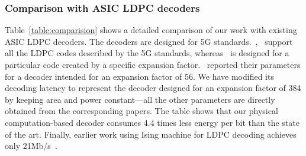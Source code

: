 \subsubsection {Comparison with ASIC LDPC decoders}
Table~\ref{table:comparision} shows a detailed comparison of our work with existing ASIC LDPC decoders. 
The decoders are designed for 5G standards.~\cite{lin202133},~\cite{lee2022multi} support all the LDPC codes described by the 5G standards, whereas~\cite{thi2021low} is designed for a particular code created by a specific expansion factor.~\cite{thi2021low} reported their parameters for a decoder intended for an expansion factor of 56. We have modified its decoding latency to represent the decoder designed for an expansion factor of 384 by keeping area and power constant—all the other parameters are directly obtained from the corresponding papers. The table shows that our physical computation-based decoder consumes 4.4 times less energy per bit than the state of the art. Finally, earlier work using Ising machine for LDPC decoding achieves only 21Mb/s~\cite{kasi2020towards}.

